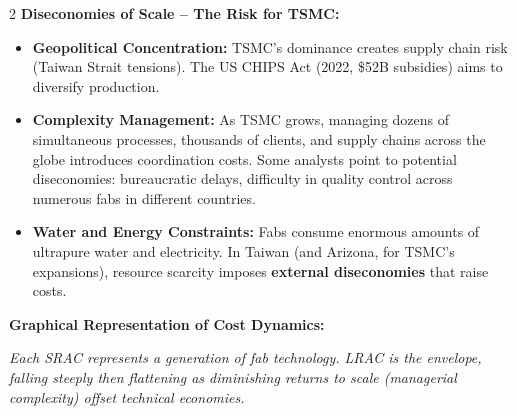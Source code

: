 \documentclass[10pt,a4paper]{article}
\begin{document}
\begin{multicols}{2}
\textbf{Diseconomies of Scale -- The Risk for TSMC:}
\begin{itemize}[leftmargin=*,nosep]
    \item \textbf{Geopolitical Concentration:} TSMC's dominance creates supply chain risk (Taiwan Strait tensions). The US CHIPS Act (2022, \$52B subsidies) aims to diversify production.
    \item \textbf{Complexity Management:} As TSMC grows, managing dozens of simultaneous processes, thousands of clients, and supply chains across the globe introduces coordination costs. Some analysts point to potential diseconomies: bureaucratic delays, difficulty in quality control across numerous fabs in different countries.
    \item \textbf{Water and Energy Constraints:} Fabs consume enormous amounts of ultrapure water and electricity. In Taiwan (and Arizona, for TSMC's expansions), resource scarcity imposes \textbf{external diseconomies} that raise costs.
\end{itemize}

\textbf{Graphical Representation of Cost Dynamics:}
\begin{center}
\end{center}
\textit{Each SRAC represents a generation of fab technology. LRAC is the envelope, falling steeply then flattening as diminishing returns to scale (managerial complexity) offset technical economies.}


\end{multicols}
\end{document}
